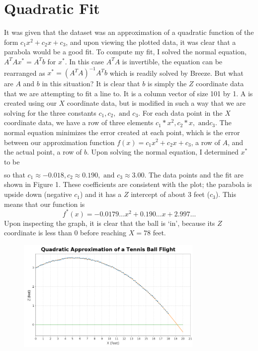 \documentclass[12pt]{article}
\begin{document}
\section*{Quadratic Fit}
It was given that the dataset was an approximation of a quadratic function of
the form $c_1 x^2 + c_2 x + c_3$, and upon viewing the plotted data, it was
clear that a parabola would be a good fit. To compute my fit, I solved the
normal equation, $A^TAx^{*} = A^Tb$ for $x^{*}$. In this case $A^TA$ is
invertible, the equation can be rearranged as $x^{*} = (A^TA)^{-1}A^Tb$ which is
readily solved by Breeze. But what are $A$ and $b$ in this situation? It is
clear that $b$ is simply the $Z$ coordinate data that we are attempting to fit a
line to. It is a column vector of size 101 by 1. A is created using our $X$
coordinate data, but is modified in such a way that we are solving for the three
constants $c_1, c_2, \text{ and } c_3$. For each data point in the $X$
coordinate data, we have a row of three elements $c_1 * x^2, c_2 * x, \text{ and
} c_3$. The normal equation minimizes the error created at each point, which is
the error between our approximation function $f(x) = c_1 x^2 + c_2 x + c_3$, a
row of $A$, and the actual point, a row of $b$. Upon solving the normal
equation, I determined $x^{*}$ to be
\begin{align*}
  [-0.017989293972666846, 0.19015793929643401, 2.9979685010321635]
\end{align*}
so that $c_1 \approx -0.018, c_2 \approx 0.190, \text{ and } c_3 \approx 3.00$.
The data points and the fit are shown in Figure 1. These coefficients are
consistent with the plot; the parabola is upside down (negative $c_1$) and it
has a $Z$ intercept of about $3$ feet ($c_3$). This means that our function is
\begin{equation*}
  f^{*}(x) = -0.0179\ldots x^2 + 0.190\ldots x + 2.997\ldots
\end{equation*}
Upon inspecting the graph, it is 
clear that the ball is `in', because its $Z$ coordinate is less than 0 before
reaching $X = 78$ feet.
\begin{figure}[p]
  \centering
  \includegraphics[width=0.8\textwidth]{fit.png}
  \caption{}
\end{figure}\\
\end{document}
